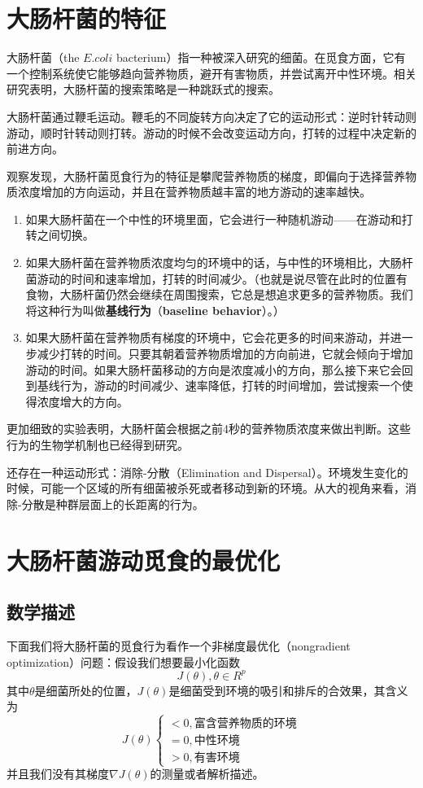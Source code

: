 \documentclass{article}
\begin{document}
\section{大肠杆菌的特征}
大肠杆菌（the $E.coli$ bacterium）指一种被深入研究的细菌。在觅食方面，它有一个控制系统使它能够趋向营养物质，避开有害物质，并尝试离开中性环境。相关研究表明，大肠杆菌的搜索策略是一种跳跃式的搜索。

大肠杆菌通过鞭毛运动。鞭毛的不同旋转方向决定了它的运动形式：逆时针转动则游动，顺时针转动则打转。游动的时候不会改变运动方向，打转的过程中决定新的前进方向。

观察发现，大肠杆菌觅食行为的特征是攀爬营养物质的梯度，即偏向于选择营养物质浓度增加的方向运动，并且在营养物质越丰富的地方游动的速率越快。
\begin{enumerate}
    \item 如果大肠杆菌在一个中性的环境里面，它会进行一种随机游动——在游动和打转之间切换。
    \item 如果大肠杆菌在营养物质浓度均匀的环境中的话，与中性的环境相比，大肠杆菌游动的时间和速率增加，打转的时间减少。（也就是说尽管在此时的位置有食物，大肠杆菌仍然会继续在周围搜索，它总是想追求更多的营养物质。我们将这种行为叫做\textbf{基线行为}（\textbf{baseline behavior}）。）
    \item 如果大肠杆菌在营养物质有梯度的环境中，它会花更多的时间来游动，并进一步减少打转的时间。只要其朝着营养物质增加的方向前进，它就会倾向于增加游动的时间。如果大肠杆菌移动的方向是浓度减小的方向，那么接下来它会回到基线行为，游动的时间减少、速率降低，打转的时间增加，尝试搜索一个使得浓度增大的方向。
\end{enumerate}

更加细致的实验表明，大肠杆菌会根据之前4秒的营养物质浓度来做出判断。这些行为的生物学机制也已经得到研究。

还存在一种运动形式：消除-分散（Elimination and Dispersal）。环境发生变化的时候，可能一个区域的所有细菌被杀死或者移动到新的环境。从大的视角来看，消除-分散是种群层面上的长距离的行为。

\section{大肠杆菌游动觅食的最优化}
\subsection{数学描述}
下面我们将大肠杆菌的觅食行为看作一个非梯度最优化（nongradient optimization）问题：假设我们想要最小化函数
\begin{equation*}
    J(\theta), \theta \in R^p  
\end{equation*}
其中$\theta$是细菌所处的位置，$J(\theta)$是细菌受到环境的吸引和排斥的合效果，其含义为
\begin{equation*}
    J(\theta) \begin{cases}
        < 0, \text{富含营养物质的环境} \\
        = 0, \text{中性环境} \\
        > 0, \text{有害环境}
    \end{cases}
\end{equation*}
并且我们没有其梯度$\nabla J(\theta)$的测量或者解析描述。
\end{document}
